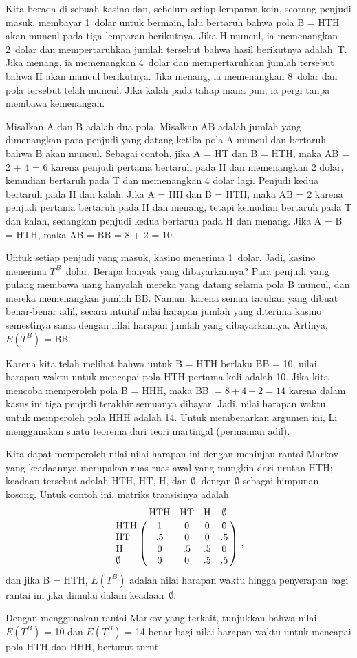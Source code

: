 \begin{LJSItem}
Kita berada di sebuah kasino dan, sebelum setiap lemparan koin, seorang penjudi
masuk, membayar 1~dolar untuk bermain, lalu bertaruh bahwa pola B = HTH akan
muncul pada tiga lemparan berikutnya. Jika H muncul, ia memenangkan 2~dolar dan
mempertaruhkan jumlah tersebut bahwa hasil berikutnya adalah~T. Jika menang, ia
memenangkan 4~dolar dan mempertaruhkan jumlah tersebut bahwa H akan muncul
berikutnya. Jika menang, ia memenangkan 8~dolar dan pola tersebut telah muncul.
Jika kalah pada tahap mana pun, ia pergi tanpa membawa kemenangan.

Misalkan A dan B adalah dua pola. Misalkan AB adalah jumlah yang dimenangkan
para penjudi yang datang ketika pola A muncul dan bertaruh bahwa B akan muncul.
Sebagai contoh, jika A = HT dan B = HTH, maka AB = 2 + 4 = 6 karena penjudi
pertama bertaruh pada H dan memenangkan 2 dolar, kemudian bertaruh pada T dan
memenangkan 4 dolar lagi. Penjudi kedua bertaruh pada H dan kalah. Jika A = HH
dan B = HTH, maka AB = 2 karena penjudi pertama bertaruh pada H dan menang,
tetapi kemudian bertaruh pada T dan kalah, sedangkan penjudi kedua bertaruh pada
H dan menang. Jika A = B = HTH, maka AB = BB = 8 + 2 = 10.
\par
Untuk setiap penjudi yang masuk, kasino menerima 1~dolar. Jadi, kasino menerima
$T^B$~dolar. Berapa banyak yang dibayarkannya? Para penjudi yang pulang membawa
uang hanyalah mereka yang datang selama pola B muncul, dan mereka memenangkan
jumlah BB. Namun, karena semua taruhan yang dibuat benar-benar adil, secara
intuitif nilai harapan jumlah yang diterima kasino semestinya sama dengan nilai
harapan jumlah yang dibayarkannya. Artinya, $E(T^B)$ = BB.
\par
Karena kita telah melihat bahwa untuk B = HTH berlaku BB = 10, nilai harapan
waktu untuk mencapai pola HTH pertama kali adalah 10. Jika kita mencoba
memperoleh pola B = HHH, maka BB $= 8 + 4 + 2 = 14$ karena dalam kasus ini tiga
penjudi terakhir semuanya dibayar. Jadi, nilai harapan waktu untuk memperoleh
pola HHH adalah 14. Untuk membenarkan argumen ini, Li menggunakan suatu teorema
dari teori martingal (permainan adil).
\par
Kita dapat memperoleh nilai-nilai harapan ini dengan meninjau rantai Markov yang
keadaannya merupakan ruas-ruas awal yang mungkin dari urutan HTH; keadaan
tersebut adalah HTH, HT, H, dan $\emptyset$, dengan $\emptyset$ sebagai himpunan
kosong. Untuk contoh ini, matriks transisinya adalah
$$
\bordermatrix{
&\mbox{HTH} & \mbox{HT} & \mbox{H} & \emptyset \cr
\mbox{HTH}  & 1 & 0 & 0 & 0 \cr
\mbox{HT}   & .5 & 0 & 0 & .5 \cr
\mbox{H}    & 0 & .5 & .5 & 0 \cr
\emptyset   & 0 & 0 & .5 & .5 }\ ,
$$
dan jika B = HTH, $E(T^B)$ adalah nilai harapan waktu hingga penyerapan bagi
rantai ini jika dimulai dalam keadaan~$\emptyset$.
\par
Dengan menggunakan rantai Markov yang terkait, tunjukkan bahwa nilai
$E(T^B)$ = 10 dan $E(T^B)$ = 14 benar bagi nilai harapan waktu untuk mencapai
pola HTH dan HHH, berturut-turut.


\end{LJSItem}
